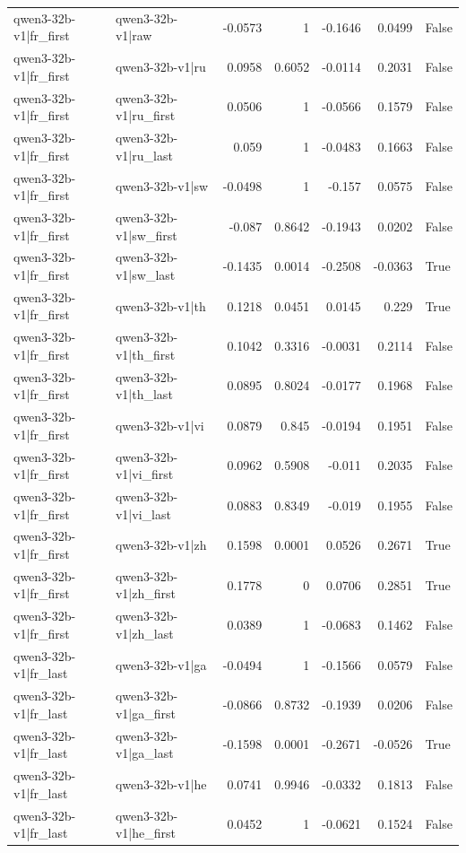 \begin{table}
\begin{tabular}{l l r r r r l}
qwen3-32b-v1|fr_first & qwen3-32b-v1|raw & -0.0573 & 1 & -0.1646 & 0.0499 & False \\
qwen3-32b-v1|fr_first & qwen3-32b-v1|ru & 0.0958 & 0.6052 & -0.0114 & 0.2031 & False \\
qwen3-32b-v1|fr_first & qwen3-32b-v1|ru_first & 0.0506 & 1 & -0.0566 & 0.1579 & False \\
qwen3-32b-v1|fr_first & qwen3-32b-v1|ru_last & 0.059 & 1 & -0.0483 & 0.1663 & False \\
qwen3-32b-v1|fr_first & qwen3-32b-v1|sw & -0.0498 & 1 & -0.157 & 0.0575 & False \\
qwen3-32b-v1|fr_first & qwen3-32b-v1|sw_first & -0.087 & 0.8642 & -0.1943 & 0.0202 & False \\
qwen3-32b-v1|fr_first & qwen3-32b-v1|sw_last & -0.1435 & 0.0014 & -0.2508 & -0.0363 & True \\
qwen3-32b-v1|fr_first & qwen3-32b-v1|th & 0.1218 & 0.0451 & 0.0145 & 0.229 & True \\
qwen3-32b-v1|fr_first & qwen3-32b-v1|th_first & 0.1042 & 0.3316 & -0.0031 & 0.2114 & False \\
qwen3-32b-v1|fr_first & qwen3-32b-v1|th_last & 0.0895 & 0.8024 & -0.0177 & 0.1968 & False \\
qwen3-32b-v1|fr_first & qwen3-32b-v1|vi & 0.0879 & 0.845 & -0.0194 & 0.1951 & False \\
qwen3-32b-v1|fr_first & qwen3-32b-v1|vi_first & 0.0962 & 0.5908 & -0.011 & 0.2035 & False \\
qwen3-32b-v1|fr_first & qwen3-32b-v1|vi_last & 0.0883 & 0.8349 & -0.019 & 0.1955 & False \\
qwen3-32b-v1|fr_first & qwen3-32b-v1|zh & 0.1598 & 0.0001 & 0.0526 & 0.2671 & True \\
qwen3-32b-v1|fr_first & qwen3-32b-v1|zh_first & 0.1778 & 0 & 0.0706 & 0.2851 & True \\
qwen3-32b-v1|fr_first & qwen3-32b-v1|zh_last & 0.0389 & 1 & -0.0683 & 0.1462 & False \\
qwen3-32b-v1|fr_last & qwen3-32b-v1|ga & -0.0494 & 1 & -0.1566 & 0.0579 & False \\
qwen3-32b-v1|fr_last & qwen3-32b-v1|ga_first & -0.0866 & 0.8732 & -0.1939 & 0.0206 & False \\
qwen3-32b-v1|fr_last & qwen3-32b-v1|ga_last & -0.1598 & 0.0001 & -0.2671 & -0.0526 & True \\
qwen3-32b-v1|fr_last & qwen3-32b-v1|he & 0.0741 & 0.9946 & -0.0332 & 0.1813 & False \\
qwen3-32b-v1|fr_last & qwen3-32b-v1|he_first & 0.0452 & 1 & -0.0621 & 0.1524 & False \\

\end{tabular}
\end{table}
